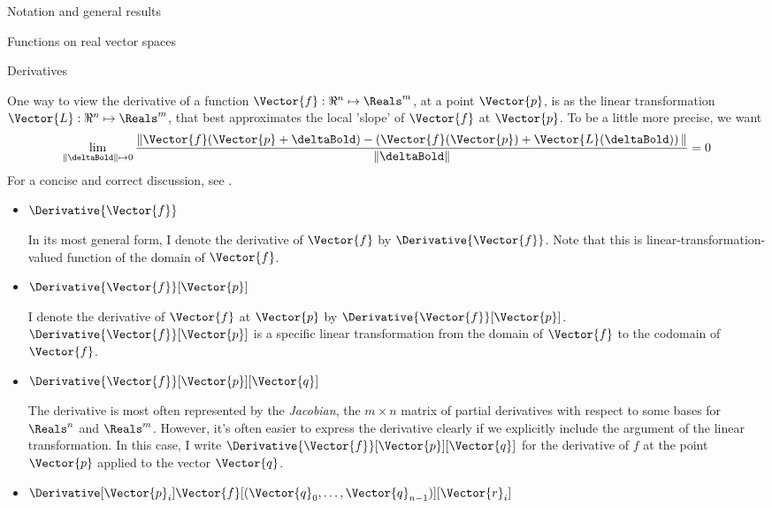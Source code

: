 \begin{plSection}{Notation and general results}
\begin{plSection}{Functions on real vector spaces}
\end{plSection}%
\begin{plSection}{Derivatives}
\label{sec:derivatives}

One way to view the derivative of a function
$\Vector{f}:{\Re}^{n} \mapsto \Reals^{m}$,
at a point $\Vector{p}$,
is as the linear transformation 
$\Vector{L}:{\Re}^{n} \mapsto \Reals^{m}$,
that best approximates the local 'slope' of 
$\Vector{f}$ at $\Vector{p}$.
To be a little more precise, we want
\begin{displaymath}
\lim_{ \|\deltaBold\| \mapsto 0}
\frac{\|
\Vector{f}(\Vector{p} + \deltaBold) 
- \left( \Vector{f}(\Vector{p}) + \Vector{L}(\deltaBold) \right) 
\|}
{\|\deltaBold\|}
 = 0
\end{displaymath}
For a concise and correct discussion, see .

\begin{itemize}

\item $\Derivative{\Vector{f}}$

In its most general form,
I denote the derivative of $\Vector{f}$ 
by $\Derivative{\Vector{f}}$.
Note that this is
linear-transformation-valued function 
of the domain of $\Vector{f}$.

\item $\Derivative{\Vector{f}}[\Vector{p}]$

I denote the derivative of $\Vector{f}$ 
at $\Vector{p}$ by $\Derivative{\Vector{f}}[\Vector{p}]$.
$\Derivative{\Vector{f}}[\Vector{p}]$ 
is a specific linear transformation from
the domain of $\Vector{f}$ to the codomain of $\Vector{f}$.

\item $\Derivative{\Vector{f}}[\Vector{p}][\Vector{q}]$

The derivative is most often represented by the {\it Jacobian},
the $m \times n$ matrix of partial derivatives
with respect to some bases for $\Reals^n$ and $\Reals^m$.
However, it's often easier to express the derivative clearly if we
explicitly include the argument of the linear transformation.
In this case, I write $\Derivative{\Vector{f}}[\Vector{p}][\Vector{q}]$
for the derivative of $f$ at the point $\Vector{p}$
applied to the vector $\Vector{q}$.

\item $\Derivative[\Vector{p}_i]
{\Vector{f}}
[(\Vector{q}_0,\ldots,\Vector{q}_{n-1})]
[\Vector{r}_i]$


\end{itemize}
\end{plSection}
\end{plSection}
